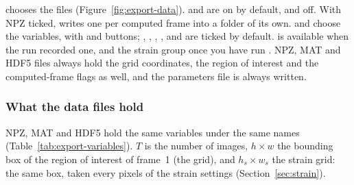 
 chooses the files (Figure~\ref{fig:export-data}).  and
 are on by default,  and  off. With NPZ
ticked,  writes one  per
computed frame into a folder of its own.  and  choose the variables,
with  and  buttons; , , , ,  and
 are ticked by default.  is available when the run recorded one, and the strain
group once you have run . NPZ, MAT and HDF5 files always hold the grid
coordinates, the region of interest and the computed-frame flags as well, and the parameters file
is always written.

\subsubsection*{What the data files hold}

NPZ, MAT and HDF5 hold the same variables under the same names (Table~\ref{tab:export-variables}).
$T$ is the number of images, $h \times w$ the bounding box of the region of interest of frame~1
(the grid), and $h_s \times w_s$ the strain grid: the same box, taken every 
pixels of the strain settings (Section~\ref{sec:strain}).


